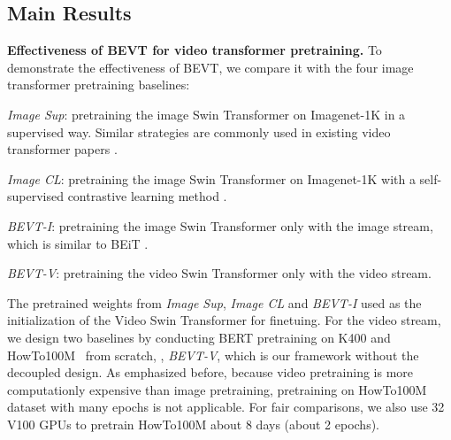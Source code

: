 \documentclass[10pt,twocolumn,letterpaper]{article}
\makeatletter
\newcommand*{\system}{BEVT\@\xspace}
\makeatother
\begin{document}
\subsection{Main Results}
\noindent\textbf{Effectiveness of \system for video transformer pretraining.} To demonstrate the effectiveness of \system, we compare it with the four image transformer pretraining baselines:
\begin{enumerate*}[label=(\arabic*)]
    \item \emph{Image Sup}: pretraining the image Swin Transformer on Imagenet-1K in a supervised way. Similar strategies are commonly used in existing video transformer papers \cite{liu2021video,arnab2021vivit,gberta_2021_ICML}. 
    \item \emph{Image CL}: pretraining the image Swin Transformer on Imagenet-1K with a self-supervised contrastive learning method \cite{xie2021self}.
    \item \emph{BEVT-I}: pretraining the image Swin Transformer only with the image stream, which is similar to BEiT \cite{bao2021beit}.
    \item \emph{BEVT-V}: pretraining the video Swin Transformer only with the video stream.
\end{enumerate*}
 The pretrained weights from \emph{Image Sup}, \emph{Image CL} and \emph{BEVT-I} used as the initialization of the Video Swin Transformer for finetuing. For the video stream, we design two baselines by conducting BERT pretraining on K400 and HowTo100M~\cite{miech2019howto100m} from scratch, \ie, \emph{BEVT-V}, which is our framework without the decoupled design. As emphasized before, because video pretraining is more computationly expensive than image pretraining, pretraining on HowTo100M dataset with many epochs is not applicable. For fair comparisons, we also use 32 V100 GPUs to pretrain HowTo100M about 8 days (about 2 epochs). 
\end{document}
